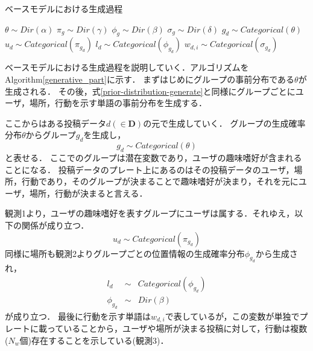 \documentclass[a4j,10pt, twocolumn]{jarticle}
\begin{document}
\begin{algorithm}[tb]
  \caption{ベースモデルにおける生成過程}\label{generative_part}
  \begin{algorithmic}[1]
    \State $\theta \sim Dir(\alpha)$ 
    \State $\pi_g \sim Dir(\gamma)$ 
    \State $\phi_g \sim Dir(\beta)$ 
    \State $\sigma_g \sim Dir(\delta)$ 
    \EndFor
     
    \State $g_d \sim Categorical(\theta)$ 
    \State $u_d \sim Categorical(\pi_{g_d})$ 
    \State $l_d \sim Categorical(\phi_{g_d})$ 
    \State $w_{d, i} \sim Categorical(\sigma_{g_d})$ 
    \EndFor
    \EndFor
  \end{algorithmic}
\end{algorithm}

ベースモデルにおける生成過程を説明していく．アルゴリズムをAlgorithm\ref{generative_part}に示す．
まずはじめにグループの事前分布である$\theta$が生成される．
その後，式\ref{prior-distribution-generate}と同様にグループごとにユーザ，場所，行動を示す単語の事前分布を生成する．

ここからはある投稿データ$d(\in \bm{D})$の元で生成していく．
グループの生成確率分布$\theta$からグループ$g_d$を生成し，
\begin{equation}
  g_d \sim Categorical(\theta)
\end{equation}
と表せる．
ここでのグループは潜在変数であり，ユーザの趣味嗜好が含まれることになる．
投稿データのプレート上にあるのはその投稿データのユーザ，場所，行動であり，そのグループが決まることで趣味嗜好が決まり，それを元にユーザ，場所，行動が決まると言える．

観測1より，ユーザの趣味嗜好を表すグループにユーザは属する．それゆえ，以下の関係が成り立つ．
\begin{equation}
  u_d \sim Categorical(\pi_{g_d})
\end{equation}
同様に場所も観測2よりグループごとの位置情報の生成確率分布$\phi_{g_d}$から生成され，
\begin{eqnarray*}
  l_d & \sim & Categorical(\phi_{g_d}) \\
  \phi_{g_d} & \sim & Dir(\beta)
\end{eqnarray*}
が成り立つ．
最後に行動を示す単語は$w_{d, i}$で表しているが，この変数が単独でプレートに載っていることから，ユーザや場所が決まる投稿に対して，行動は複数($N_w$個)存在することを示している(観測3)．
\end{document}
